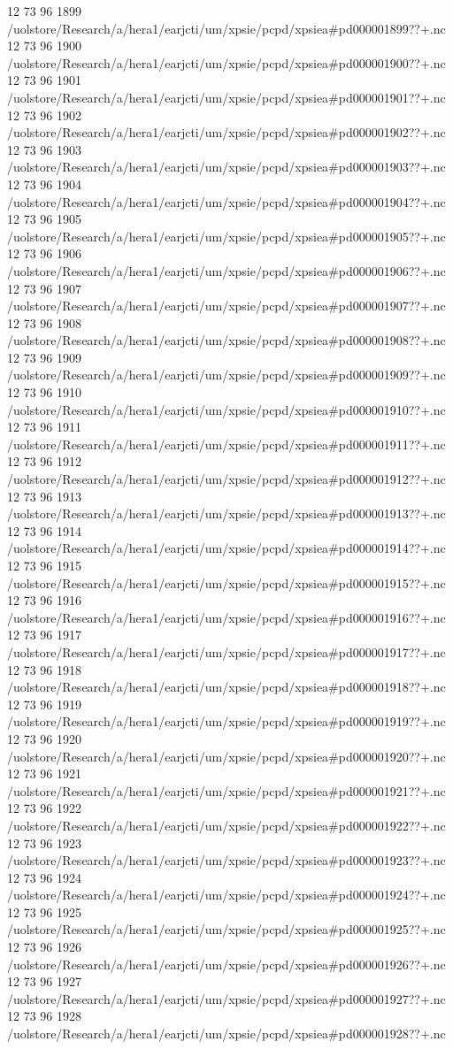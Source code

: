 12 73 96
1899
/uolstore/Research/a/hera1/earjcti/um/xpsie/pcpd/xpsiea#pd000001899??+.nc
12 73 96
1900
/uolstore/Research/a/hera1/earjcti/um/xpsie/pcpd/xpsiea#pd000001900??+.nc
12 73 96
1901
/uolstore/Research/a/hera1/earjcti/um/xpsie/pcpd/xpsiea#pd000001901??+.nc
12 73 96
1902
/uolstore/Research/a/hera1/earjcti/um/xpsie/pcpd/xpsiea#pd000001902??+.nc
12 73 96
1903
/uolstore/Research/a/hera1/earjcti/um/xpsie/pcpd/xpsiea#pd000001903??+.nc
12 73 96
1904
/uolstore/Research/a/hera1/earjcti/um/xpsie/pcpd/xpsiea#pd000001904??+.nc
12 73 96
1905
/uolstore/Research/a/hera1/earjcti/um/xpsie/pcpd/xpsiea#pd000001905??+.nc
12 73 96
1906
/uolstore/Research/a/hera1/earjcti/um/xpsie/pcpd/xpsiea#pd000001906??+.nc
12 73 96
1907
/uolstore/Research/a/hera1/earjcti/um/xpsie/pcpd/xpsiea#pd000001907??+.nc
12 73 96
1908
/uolstore/Research/a/hera1/earjcti/um/xpsie/pcpd/xpsiea#pd000001908??+.nc
12 73 96
1909
/uolstore/Research/a/hera1/earjcti/um/xpsie/pcpd/xpsiea#pd000001909??+.nc
12 73 96
1910
/uolstore/Research/a/hera1/earjcti/um/xpsie/pcpd/xpsiea#pd000001910??+.nc
12 73 96
1911
/uolstore/Research/a/hera1/earjcti/um/xpsie/pcpd/xpsiea#pd000001911??+.nc
12 73 96
1912
/uolstore/Research/a/hera1/earjcti/um/xpsie/pcpd/xpsiea#pd000001912??+.nc
12 73 96
1913
/uolstore/Research/a/hera1/earjcti/um/xpsie/pcpd/xpsiea#pd000001913??+.nc
12 73 96
1914
/uolstore/Research/a/hera1/earjcti/um/xpsie/pcpd/xpsiea#pd000001914??+.nc
12 73 96
1915
/uolstore/Research/a/hera1/earjcti/um/xpsie/pcpd/xpsiea#pd000001915??+.nc
12 73 96
1916
/uolstore/Research/a/hera1/earjcti/um/xpsie/pcpd/xpsiea#pd000001916??+.nc
12 73 96
1917
/uolstore/Research/a/hera1/earjcti/um/xpsie/pcpd/xpsiea#pd000001917??+.nc
12 73 96
1918
/uolstore/Research/a/hera1/earjcti/um/xpsie/pcpd/xpsiea#pd000001918??+.nc
12 73 96
1919
/uolstore/Research/a/hera1/earjcti/um/xpsie/pcpd/xpsiea#pd000001919??+.nc
12 73 96
1920
/uolstore/Research/a/hera1/earjcti/um/xpsie/pcpd/xpsiea#pd000001920??+.nc
12 73 96
1921
/uolstore/Research/a/hera1/earjcti/um/xpsie/pcpd/xpsiea#pd000001921??+.nc
12 73 96
1922
/uolstore/Research/a/hera1/earjcti/um/xpsie/pcpd/xpsiea#pd000001922??+.nc
12 73 96
1923
/uolstore/Research/a/hera1/earjcti/um/xpsie/pcpd/xpsiea#pd000001923??+.nc
12 73 96
1924
/uolstore/Research/a/hera1/earjcti/um/xpsie/pcpd/xpsiea#pd000001924??+.nc
12 73 96
1925
/uolstore/Research/a/hera1/earjcti/um/xpsie/pcpd/xpsiea#pd000001925??+.nc
12 73 96
1926
/uolstore/Research/a/hera1/earjcti/um/xpsie/pcpd/xpsiea#pd000001926??+.nc
12 73 96
1927
/uolstore/Research/a/hera1/earjcti/um/xpsie/pcpd/xpsiea#pd000001927??+.nc
12 73 96
1928
/uolstore/Research/a/hera1/earjcti/um/xpsie/pcpd/xpsiea#pd000001928??+.nc
